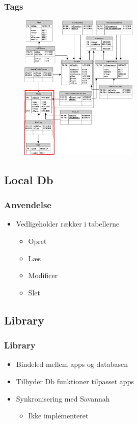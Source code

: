 \documentclass{beamer}
\begin{document}
\begin{frame}
	\frametitle{Tags}
	
	\begin{figure}[!h]
		\centering
			\includegraphics[width=0.5\textwidth]{dbTags}
		\label{fig:Tags}
	\end{figure}
\end{frame}

\subsection{Local Db}

\begin{frame}
	\frametitle{Anvendelse}
	
	\begin{itemize}
		\item Vedligeholder r\ae{}kker i tabellerne
		\begin{itemize}
			\item Opret
			\item L\ae{}s
			\item Modificer
			\item Slet
		\end{itemize}
	\end{itemize}
\end{frame}

\subsection{Library}

\begin{frame}
	\frametitle{Library}
	\begin{itemize}
		\item Bindeled mellem apps og databasen
		\item Tilbyder Db funktioner tilpasset apps
	\end{itemize}
	\begin{itemize}
		\item Synkronisering med Savannah
		\begin{itemize}
			\item Ikke implementeret
		\end{itemize}
	\end{itemize}
\end{frame}
\end{document}
